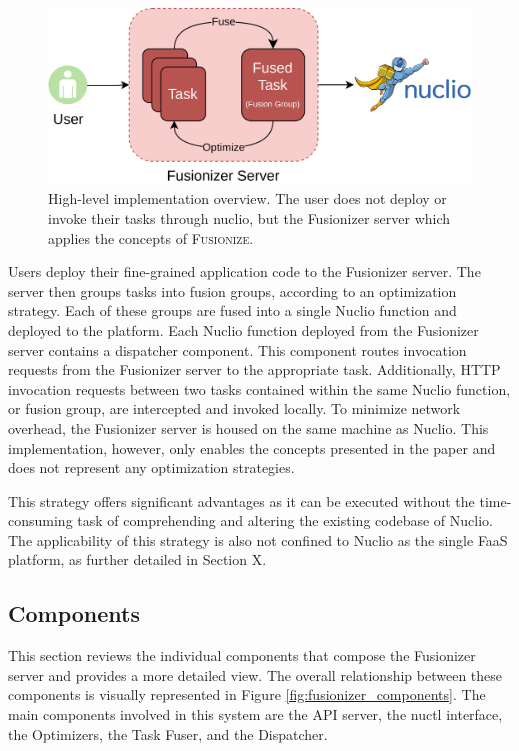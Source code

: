 \begin{figure}
    \centering
    \includegraphics[width=\linewidth]{../figures/fusionizer_highlvl}
    \caption{
        High-level implementation overview. The user does not deploy or invoke
        their tasks through nuclio, but the Fusionizer server which applies the
        concepts of \textsc{Fusionize}.
    }
    \label{fig:fusionizer_highlvl}
\end{figure}

Users deploy their fine-grained application code to the Fusionizer server. The
server then groups tasks into fusion groups, according to an optimization
strategy. Each of these groups are fused into a single Nuclio function and
deployed to the platform. Each Nuclio function deployed from the Fusionizer
server contains a dispatcher component. This component routes invocation
requests from the Fusionizer server to the appropriate task. Additionally, HTTP
invocation requests between two tasks contained within the same Nuclio function,
or fusion group, are intercepted and invoked locally. To minimize network
overhead, the Fusionizer server is housed on the same machine as Nuclio. This
implementation, however, only enables the concepts presented in the paper and
does not represent any optimization strategies.

This strategy offers significant advantages as it can be executed without the
time-consuming task of comprehending and altering the existing codebase of
Nuclio. The applicability of this strategy is also not confined to Nuclio as the
single FaaS platform, as further detailed in Section X.

\subsection{Components}

This section reviews the individual components that compose the Fusionizer
server and provides a more detailed view. The overall relationship between these
components is visually represented in Figure \ref{fig:fusionizer_components}.
The main components involved in this system are the API server, the nuctl
interface, the Optimizers, the Task Fuser, and the Dispatcher.

